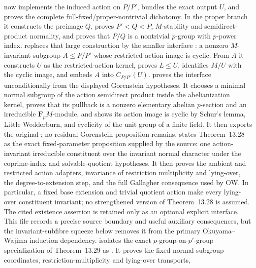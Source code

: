 \documentclass[11pt]{article}
\begin{document}
 now implements
the induced action on \(P/P'\), bundles the exact output \(U\), and proves
the complete full-fixed/proper-nontrivial dichotomy.  In the proper branch
it constructs the preimage \(Q\), proves
\(P'<Q<P\), \(M\)-stability and semidirect-product normality, and proves
that \(P/Q\) is a nontrivial \(p\)-group with \(p\)-power index.
 replaces that
large construction by the smaller interface
: a nonzero
\(M\)-invariant subgroup \(A\leq P/P'\) whose restricted action image is
cyclic.  From \(A\) it constructs \(U\) as the restricted-action kernel,
proves \(L\leq U\), identifies \(M/U\) with the cyclic image, and embeds
\(A\) into \(C_{P/P'}(U)\).
 proves the
interface unconditionally from the displayed Gorenstein hypotheses.  It
chooses a minimal normal subgroup of the action semidirect product inside
the abelianization kernel, proves that its pullback is a nonzero
elementary abelian \(p\)-section and an irreducible
\(\mathbf F_p M\)-module, and shows its action image is cyclic by Schur's
lemma, Little Wedderburn, and cyclicity of the unit group of a finite
field.  It then exports the original
; no residual
Gorenstein proposition remains.
 states Theorem~13.28 as
the exact fixed-parameter proposition supplied by the source: one
action-invariant irreducible constituent over the invariant normal
character under the coprime-index and solvable-quotient hypotheses.  It
then proves the ambient and restricted action adapters, invariance of
restriction multiplicity and lying-over, the degree-to-extension step,
and the full Gallagher consequence used by OW.  In particular, a fixed
base extension and trivial quotient action make every lying-over
constituent invariant; no strengthened version of Theorem~13.28 is
assumed.  The cited existence assertion is retained only as an optional
explicit interface.  This file records a precise source boundary and
useful auxiliary consequences, but the invariant-subfibre squeeze below
removes it from the primary Okuyama--Wajima induction dependency.
 isolates the exact
\(p\)-group-on-\(p'\)-group specialization of Theorem~13.29 as
.  It proves the fixed-normal
subgroup coordinates, restriction-multiplicity and lying-over transports,
\end{document}
